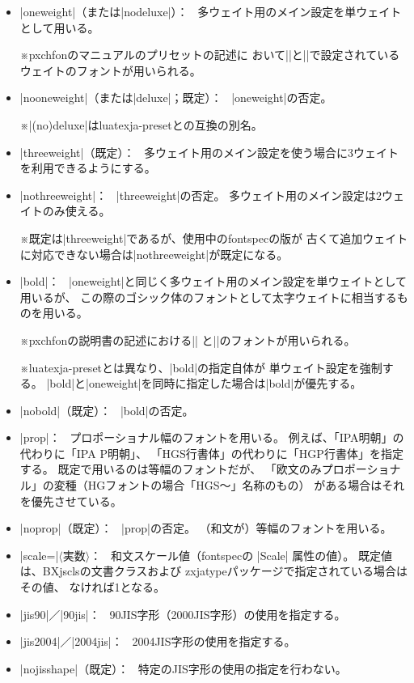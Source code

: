 \documentclass[xelatex,ja=standard,jafont=ipaex,
  a4paper]{bxjsarticle}
\newcommand{\Pkg}[1]{\textsf{#1}}
\newcommand{\Meta}[1]{$\langle$\mbox{}#1\mbox{}$\rangle$}
\newcommand{\Note}{\par\noindent ※}
\newcommand{\Means}{：\ }
\newcommand{\JSl}{\mbox{／}\linebreak[0]}
\begin{document}
\begin{itemize}
\item |oneweight|（または|nodeluxe|）\Means
多ウェイト用のメイン設定を単ウェイトとして用いる。
\Note \Pkg{pxchfon}のマニュアルのプリセットの記述に
おいて\>|\setminchofont|\>と\>|\setgothicfont|\>で設定されている
ウェイトのフォントが用いられる。
\item |nooneweight|（または|deluxe|；既定）\Means
|oneweight|\>の否定。
\Note |(no)deluxe|\>は\Pkg{luatexja-preset}との互換の別名。

\item |threeweight|（既定）\Means
多ウェイト用のメイン設定を使う場合に3ウェイトを利用できるようにする。
\item |nothreeweight|\Means
|threeweight|\>の否定。
多ウェイト用のメイン設定は2ウェイトのみ使える。
\Note 既定は\>|threeweight|\>であるが、使用中の\Pkg{fontspec}の版が
古くて追加ウェイトに対応できない場合は\>|nothreeweight|\>が既定になる。

\item |bold|\Means
|oneweight|\>と同じく多ウェイト用のメイン設定を単ウェイトとして用いるが、
この際のゴシック体のフォントとして太字ウェイトに相当するものを用いる。
\Note \Pkg{pxchfon}の説明書の記述における\>|\setminchofont|\>%
と\>|\setboldgothicfont|\>のフォントが用いられる。
\Note \Pkg{luatexja-preset}とは異なり、|bold|\>の指定自体が
単ウェイト設定を強制する。
|bold|\>と\>|oneweight|\>を同時に指定した場合は\>|bold|\>が優先する。
\item |nobold|（既定）\Means
|bold|\>の否定。

\item |prop|\Means
プロポーショナル幅のフォントを用いる。
例えば、「IPA明朝」の代わりに「IPA P明朝」、
「HGS行書体」の代わりに「HGP行書体」を指定する。
既定で用いるのは等幅のフォントだが、
「欧文のみプロポーショナル」の変種（HGフォントの場合「HGS～」名称のもの）
がある場合はそれを優先させている。
\item |noprop|（既定）\Means
|prop|\>の否定。
（和文が）等幅のフォントを用いる。

\item |scale=|\Meta{実数}\Means
和文スケール値（\Pkg{fontspec}の |Scale| 属性の値）。
既定値は、\Pkg{BXjscls}の文書クラスおよび
\Pkg{zxjatype}パッケージで指定されている場合はその値、
なければ1となる。

\item |jis90|\JSl|90jis|\Means
90JIS字形（2000JIS字形）の使用を指定する。
\item |jis2004|\JSl|2004jis|\Means
2004JIS字形の使用を指定する。
\item |nojisshape|（既定）\Means
特定のJIS字形の使用の指定を行わない。


\end{itemize}
\end{document}
